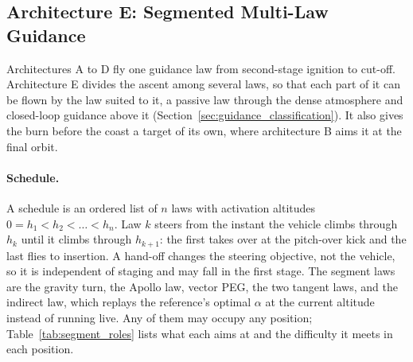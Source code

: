 
\subsection{Architecture E: Segmented Multi-Law Guidance}
\label{ssec:segmented}

Architectures A to D fly one guidance law from second-stage ignition to cut-off. Architecture E
divides the ascent among several laws, so that each part of it can be flown by the law suited to
it, a passive law through the dense atmosphere and closed-loop guidance above it
(Section~\ref{sec:guidance_classification}). It also gives the burn before the coast a target of
its own, where architecture B aims it at the final orbit.

\paragraph{Schedule.}
A schedule is an ordered list of $n$ laws with activation altitudes $0 = h_1 < h_2 < \dots < h_n$.
Law $k$ steers from the instant the vehicle climbs through $h_k$ until it climbs through
$h_{k+1}$: the first takes over at the pitch-over kick and the last flies to insertion. A hand-off
changes the steering objective, not the vehicle, so it is independent of staging and may fall in
the first stage. The segment laws are the gravity turn, the Apollo law, vector PEG, the two tangent
laws, and the indirect law, which replays the reference's optimal $\alpha$ at the current altitude
instead of running live. Any of them may occupy any position; Table~\ref{tab:segment_roles} lists
what each aims at and the difficulty it meets in each position.

